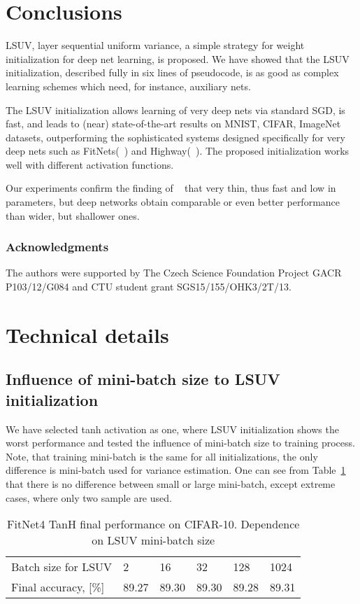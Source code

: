 \documentclass{article} \clearpage{}\usepackage{iclr2016_conference,times}
\begin{document}
\section{Conclusions}
\label{conclusions}
LSUV, layer sequential uniform variance, a simple strategy for weight initialization for deep net learning, is proposed.
We have showed that the LSUV initialization, described fully in six lines of pseudocode, is as good as complex learning schemes which need, for instance, auxiliary nets.

The LSUV initialization allows learning of very deep nets via standard SGD, is fast, and leads to (near) state-of-the-art results on MNIST, CIFAR, ImageNet datasets, outperforming the sophisticated systems designed specifically for very deep nets such as FitNets(~\cite{FitNets2014}) and Highway(~\cite{Highway2015}). The proposed initialization works well with different activation functions. 
  
 Our experiments confirm the finding of ~\cite{FitNets2014} that very thin, thus fast and low in parameters, but deep networks obtain comparable or even better performance than wider, but shallower ones. 
\subsubsection*{Acknowledgments}
The authors were supported by The Czech Science Foundation Project GACR P103/12/G084 and CTU student grant 
SGS15/155/OHK3/2T/13.



\appendix
\section{Technical details}
\subsection{Influence of mini-batch size to LSUV initialization}
We have selected tanh activation as one, where LSUV initialization shows the worst performance and tested the influence of mini-batch size to training process. Note, that training mini-batch is the same for all initializations, the only difference is mini-batch used for variance estimation. One can see from Table~\ref{tab:batchsize} that there is no difference between small or large mini-batch, except extreme cases, where only two sample are used. 
\begin{table}[htb]
\caption{FitNet4 TanH final performance on CIFAR-10. Dependence on LSUV mini-batch size}
\label{tab:batchsize}
\centering
\begin{tabular}{l|lllll}
\hline
Batch size for LSUV&2 & 16 & 32 & 128 & 1024\\
Final accuracy, [\%] & 89.27 & 89.30 &89.30 &89.28 & 89.31 \\
\hline
\end{tabular}
\end{table}
\end{document}
